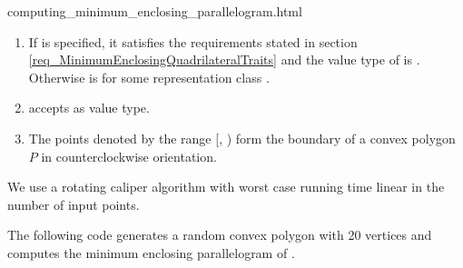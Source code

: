 \begin{ccHtmlClassFile}{computing_minimum_enclosing_parallelogram.html}
  \begin{enumerate}
  \item If  is specified, it satisfies the requirements
    stated in section \ref{req_MinimumEnclosingQuadrilateralTraits}
    and the value type  of  is
    . Otherwise  is
     for some representation class .
  \item {} accepts  as value type.
  \item The points denoted by the range [,
    ) form the boundary of a convex polygon $P$ in
    counterclockwise orientation.
  \end{enumerate}
  
  \ccImplementation We use a rotating caliper algorithm
  \cite{stvwe-mepa-95,v-fmep-90} with worst case running time linear
  in the number of input points.
  
  \ccExample The following code generates a random convex polygon
   with 20 vertices and computes the minimum enclosing
  parallelogram of .


\end{ccHtmlClassFile}

